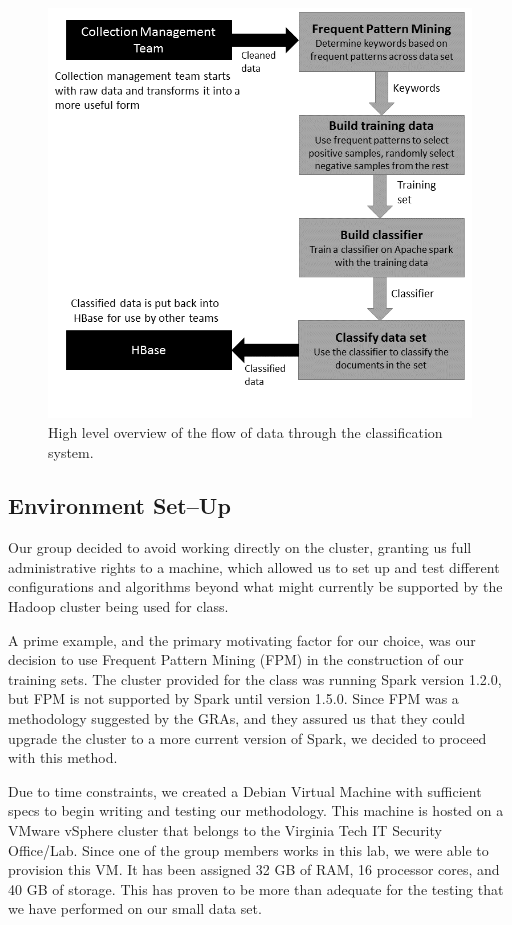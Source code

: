 \begin{figure}[ht]
	\centering
	\includegraphics[scale=.65]{figures/design_flow_chart.png}
    \caption{High level overview of the flow of data through the classification system.}\label{fig:overview}
\end{figure}

\subsection{Environment Set--Up}
Our group decided to avoid working directly on the cluster, granting us full administrative rights to a machine, which allowed us to set up and test different configurations and algorithms beyond what might currently be supported by the Hadoop cluster being used for class.

A prime example, and the primary motivating factor for our choice, was our decision to use Frequent Pattern Mining (FPM) in the construction of our training sets. The cluster provided for the class was running Spark version 1.2.0, but FPM is not supported by Spark until version 1.5.0. Since FPM was a methodology suggested by the GRAs, and they assured us that they could upgrade the cluster to a more current version of Spark, we decided to proceed with this method.

Due to time constraints, we created a Debian Virtual Machine with sufficient specs to begin writing and testing our methodology. This machine is hosted on a VMware vSphere cluster that belongs to the Virginia Tech IT Security Office/Lab. Since one of the group members works in this lab, we were able to provision this VM. It has been assigned 32 GB of RAM, 16 processor cores, and 40 GB of storage. This has proven to be more than adequate for the testing that we have performed on our small data set.

